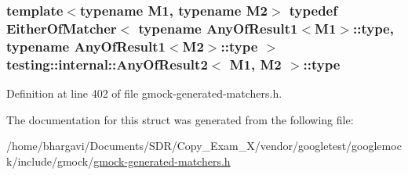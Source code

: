 \subsubsection[{\texorpdfstring{type}{type}}]{\setlength{\rightskip}{0pt plus 5cm}template$<$typename M1, typename M2$>$ typedef {\bf Either\+Of\+Matcher}$<$ typename {\bf Any\+Of\+Result1}$<$M1$>$\+::{\bf type}, typename {\bf Any\+Of\+Result1}$<$M2$>$\+::{\bf type} $>$ {\bf testing\+::internal\+::\+Any\+Of\+Result2}$<$ M1, M2 $>$\+::{\bf type}}\hypertarget{structtesting_1_1internal_1_1_any_of_result2_a6d9eba508021f8e652c7c154a649073f}{}\label{structtesting_1_1internal_1_1_any_of_result2_a6d9eba508021f8e652c7c154a649073f}


Definition at line 402 of file gmock-\/generated-\/matchers.\+h.



The documentation for this struct was generated from the following file\+:\begin{DoxyCompactItemize}
\item 
/home/bhargavi/\+Documents/\+S\+D\+R/\+Copy\+\_\+\+Exam\+\_\+X/vendor/googletest/googlemock/include/gmock/\hyperlink{gmock-generated-matchers_8h}{gmock-\/generated-\/matchers.\+h}\end{DoxyCompactItemize}
